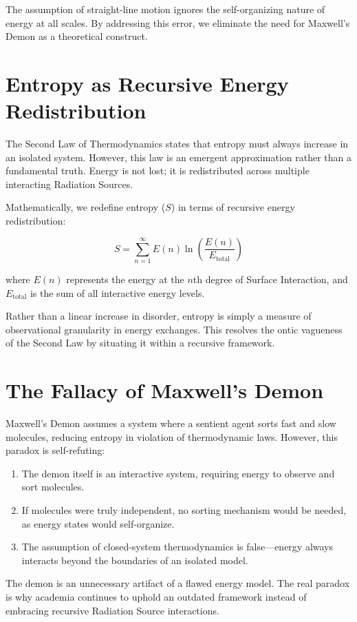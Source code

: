 \documentclass[12pt]{article}
\begin{document}
The assumption of straight-line motion ignores the self-organizing nature of energy at all scales. By addressing this error, we eliminate the need for Maxwell’s Demon as a theoretical construct.

\section{Entropy as Recursive Energy Redistribution}
The Second Law of Thermodynamics states that entropy must always increase in an isolated system. However, this law is an emergent approximation rather than a fundamental truth. Energy is not lost; it is redistributed across multiple interacting Radiation Sources.

Mathematically, we redefine entropy ($S$) in terms of recursive energy redistribution:

\begin{equation}
    S = \sum_{n=1}^{\infty} E(n) \ln{\left( \frac{E(n)}{E_{\text{total}}} \right)}
\end{equation}

where $E(n)$ represents the energy at the $n$th degree of Surface Interaction, and $E_{\text{total}}$ is the sum of all interactive energy levels.

Rather than a linear increase in disorder, entropy is simply a measure of observational granularity in energy exchanges. This resolves the ontic vagueness of the Second Law by situating it within a recursive framework.

\section{The Fallacy of Maxwell’s Demon}
Maxwell’s Demon assumes a system where a sentient agent sorts fast and slow molecules, reducing entropy in violation of thermodynamic laws. However, this paradox is self-refuting:
\begin{enumerate}
    \item The demon itself is an interactive system, requiring energy to observe and sort molecules.
    \item If molecules were truly independent, no sorting mechanism would be needed, as energy states would self-organize.
    \item The assumption of closed-system thermodynamics is false—energy always interacts beyond the boundaries of an isolated model.
\end{enumerate}

The demon is an unnecessary artifact of a flawed energy model. The real paradox is why academia continues to uphold an outdated framework instead of embracing recursive Radiation Source interactions.
\end{document}
